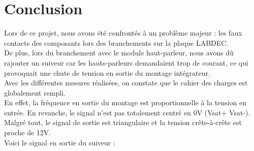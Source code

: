 \chapter{Conclusion}

Lors de ce projet, nous avons été confrontés à un problème majeur : les faux contacts des composants lors des branchements sur la plaque LABDEC.\\

De plus, lors du branchement avec le module haut-parleur, nous avons dû rajouter un suiveur car les hauts-parleurs demandaient trop de courant, 
ce qui provoquait une chute de tension en sortie du montage intégrateur.\\

Avec les différentes mesures réalisées, on constate que le cahier des charges est globalement rempli.\\
En effet, la fréquence en sortie du montage est proportionnelle à la tension en entrée. En revanche, le signal n’est pas totalement centré en 0V (Vsat+ Vsat-). 
Malgré tout, le signal de sortie est triangulaire et la tension crête-à-crête est proche de 12V.\\




Voici le signal en sortie du suiveur :

 
















